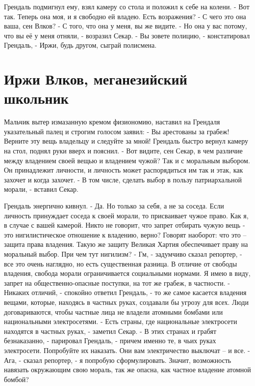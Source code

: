 \documentclass[10pt,final]{book}
\begin{document}
Грендаль подмигнул ему, взял камеру со стола и положил к себе на колени.
- Вот так. Теперь она моя, и я свободно ей владею. Есть возражения?
- С чего это она ваша, сен Влков?
- С того, что она у меня, вы же видите.
- Но она у вас потому, что вы её у меня отняли, - возразил Секар.
- Вы зовете полицию, - констатировал Грендаль, - Иржи, будь другом, сыграй полисмена.


\chapter{Иржи Влков, меганезийский школьник}


Мальчик вытер измазанную кремом физиономию, наставил на Грендаля указательный палец и строгим голосом заявил:
- Вы арестованы за грабеж! Верните эту вещь владельцу и следуйте за мной!
Грендаль быстро вернул камеру на стол, поднял руки вверх и пояснил.
- Вот видите, сен Секар, в чем различие между владением своей вещью и владением чужой? Так и с моральным выбором. Он принадлежит личности, и личность может распорядиться им так и этак, как захочет и когда захочет.
- В том числе, сделать выбор в пользу патриархальной морали, - вставил Секар.

Грендаль энергично кивнул.
- Да. Но только за себя, а не за соседа. Если личность принуждает соседа к своей морали, то присваивает чужое право. Как я, в случае с вашей камерой. Никто не говорит, что запрет отбирать чужую вещь - это нигилистическое отношение к владению, верно? Говорят наоборот: что это -- защита права владения. Такую же защиту Великая Хартия обеспечивает праву на моральный выбор. При чем тут нигилизм?
- Гм, - задумчиво сказал репортер, - все это очень наглядно, но есть существенная разница. В отличие от свободы владения, свобода морали ограничивается социальными нормами. Я имею в виду, запрет на общественно-опасные поступки, на тот же грабеж, в частности.
- Никаких отличий, - спокойно ответил Грендаль, - то же самое касается владения вещами, которые, находясь в частных руках, создавали бы угрозу для всех. Люди договариваются, чтобы частные лица не владели атомными бомбами или национальными электросетями.
- Есть страны, где национальные электросети находятся в частных руках, - заметил Секар.
- В этих странах и грабят безнаказанно, - парировал Грендаль, - причем именно те, в чьих руках электросети. Попробуйте их наказать. Они вам электричество выключат -- и все.
- Ага, - сказал репортер, - я попробую сформулировать. Значит, возможность навязать окружающим свою мораль, так же опасна, как частное владение атомной бомбой?
\end{document}
